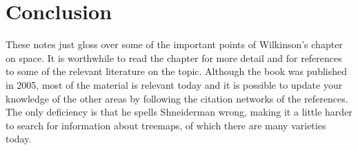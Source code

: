 \hypertarget{conclusion}{%
\section{Conclusion}\label{conclusion}}

These notes just gloss over some of the important points of Wilkinson's
chapter on space. It is worthwhile to read the chapter for more detail
and for references to some of the relevant literature on the topic.
Although the book was published in 2005, most of the material is
relevant today and it is possible to update your knowledge of the other
areas by following the citation networks of the references. The only
deficiency is that he spells Shneiderman wrong, making it a little
harder to search for information about treemaps, of which there are many
varieties today.
